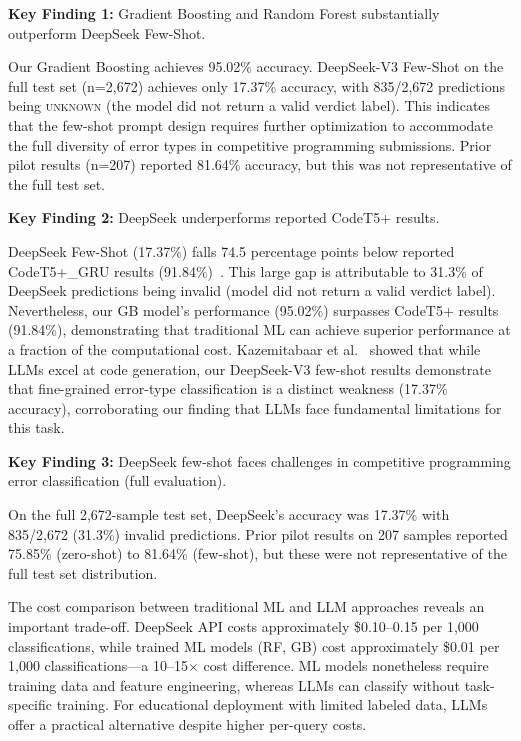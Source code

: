 \documentclass[10pt,a4paper]{article}
\begin{document}
\textbf{Key Finding 1:} Gradient Boosting and Random Forest substantially
outperform DeepSeek Few-Shot.

Our Gradient Boosting achieves 95.02\% accuracy. DeepSeek-V3 Few-Shot on the
full test set (n=2,672) achieves only 17.37\% accuracy, with 835/2,672
predictions being \textsc{unknown} (the model did not return a valid verdict
label). This indicates that the few-shot prompt design requires further
optimization to accommodate the full diversity of error types in competitive
programming submissions. Prior pilot results (n=207) reported 81.64\% accuracy,
but this was not representative of the full test set.

\textbf{Key Finding 2:} DeepSeek underperforms reported CodeT5+ results.

DeepSeek Few-Shot (17.37\%) falls 74.5 percentage points below reported
CodeT5+\_GRU results (91.84\%)~\cite{wang2023codet5plus}. This large gap is
attributable to 31.3\% of DeepSeek predictions being invalid (model did not
return a valid verdict label). Nevertheless, our GB model's performance
(95.02\%) surpasses CodeT5+ results (91.84\%), demonstrating that traditional
ML can achieve superior performance at a fraction of the computational cost.
Kazemitabaar et al.~\cite{kazemitabaar2024impact} showed that while LLMs
excel at code generation, our DeepSeek-V3 few-shot results demonstrate that
fine-grained error-type classification is a distinct weakness (17.37\%
accuracy), corroborating our finding that LLMs face fundamental limitations
for this task.

\textbf{Key Finding 3:} DeepSeek few-shot faces challenges in competitive
programming error classification (full evaluation).

On the full 2,672-sample test set, DeepSeek's accuracy was 17.37\% with
835/2,672 (31.3\%) invalid predictions. Prior pilot results on 207 samples
reported 75.85\% (zero-shot) to 81.64\% (few-shot), but these were not
representative of the full test set distribution.

The cost comparison between traditional ML and LLM approaches reveals an
important trade-off. DeepSeek API costs approximately \$0.10--0.15 per 1,000
classifications, while trained ML models (RF, GB) cost approximately \$0.01
per 1,000 classifications---a 10--15$\times$ cost difference. ML models
nonetheless require training data and feature engineering, whereas LLMs can
classify without task-specific training. For educational deployment with
limited labeled data, LLMs offer a practical alternative despite higher
per-query costs.
\end{document}
